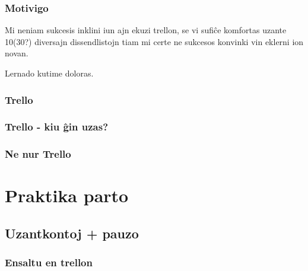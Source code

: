 \documentclass{beamer}
\begin{document}
   
  \begin{frame}
    \frametitle{Motivigo}
    
    Mi neniam sukcesis inklini iun ajn ekuzi trellon, se vi sufiĉe komfortas uzante 10(30?) diversajn dissendlistojn tiam mi certe ne sukcesos konvinki vin eklerni ion novan.
    
    Lernado kutime doloras.
  \end{frame}



  \begin{frame}
    \frametitle{Trello}
    
    
  \end{frame}
  
  \begin{frame}
    \frametitle{Trello - kiu ĝin uzas?}
    
    
  \end{frame}
  
  

  \begin{frame}
    \frametitle{Ne nur Trello}
    
  \end{frame}



\section{Praktika parto}
\subsection{Uzantkontoj + pauzo}
  \begin{frame}
    \frametitle{Ensaltu en trellon}
    
  \end{frame}
\end{document}
